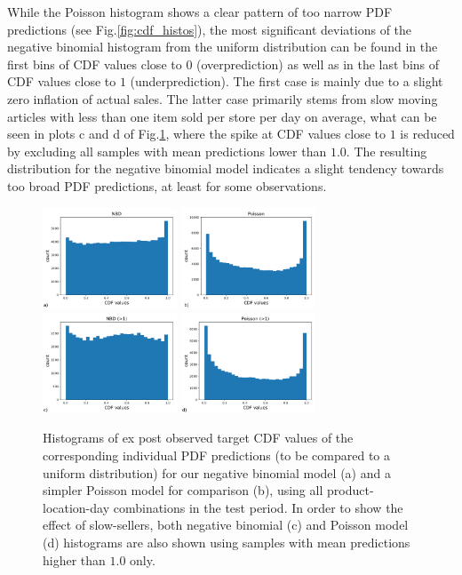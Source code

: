 \documentclass[BCOR=1mm, DIV=calc,10pt,
twoside=true,
twocolumn,
headings=normal]{scrartcl}
\newcommand{\fig}{Fig.}
\begin{document}
\noindent
While the Poisson histogram shows a clear pattern of too narrow PDF predictions (see \fig \ref{fig:cdf_histos}), the most significant deviations of the negative binomial histogram from the uniform distribution can be found in the first bins of CDF values close to $0$ (overprediction) as well as in the last bins of CDF values close to $1$ (underprediction). The first case is mainly due to a slight zero inflation of actual sales. The latter case primarily stems from slow moving articles with less than one item sold per store per day on average, what can be seen in plots c and d of \fig \ref{fig:cdf_demand}, where the spike at CDF values close to $1$ is reduced by excluding all samples with mean predictions lower than $1.0$. The resulting distribution for the negative binomial model indicates a slight tendency towards too broad PDF predictions, at least for some observations.

\begin{figure}
\begin{center}
\includegraphics[width=4cm]{../figures/cdf_truth_nbinom}
\includegraphics[width=4cm]{../figures/cdf_truth_poisson}
\includegraphics[width=4cm]{../figures/cdf_truth_nbinom_larger1}
\includegraphics[width=4cm]{../figures/cdf_truth_poisson_larger1}
\caption{\label{fig:cdf_demand} Histograms of ex post observed target CDF values of the corresponding individual PDF predictions (to be compared to a uniform distribution) for our negative binomial model (a) and a simpler Poisson model for comparison (b), using all product-location-day combinations in the test period. In order to show the effect of slow-sellers, both negative binomial (c) and Poisson model (d) histograms are also shown using samples with mean predictions higher than $1.0$ only.}
\end{center}
\end{figure}
\end{document}
